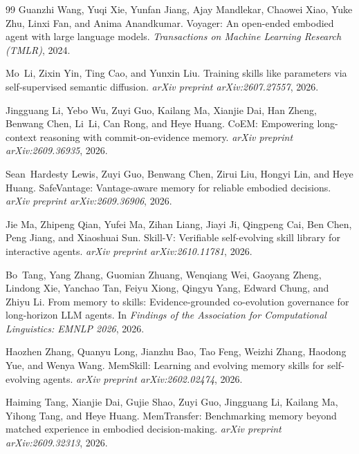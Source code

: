 \documentclass[11pt,a4paper]{article}
\begin{document}
\begin{thebibliography}{99}
Guanzhi Wang, Yuqi Xie, Yunfan Jiang, Ajay Mandlekar, Chaowei Xiao, Yuke Zhu, Linxi Fan, and Anima Anandkumar.
\newblock Voyager: An open-ended embodied agent with large language models.
\newblock \emph{Transactions on Machine Learning Research (TMLR)}, 2024.

Mo~Li, Zixin Yin, Ting Cao, and Yunxin Liu.
\newblock Training skills like parameters via self-supervised semantic diffusion.
\newblock \emph{arXiv preprint arXiv:2607.27557}, 2026.

Jingguang Li, Yebo Wu, Zuyi Guo, Kailang Ma, Xianjie Dai, Han Zheng, Benwang Chen, Li~Li, Can Rong, and Heye Huang.
\newblock CoEM: Empowering long-context reasoning with commit-on-evidence memory.
\newblock \emph{arXiv preprint arXiv:2609.36935}, 2026.

Sean~Hardesty Lewis, Zuyi Guo, Benwang Chen, Zirui Liu, Hongyi Lin, and Heye Huang.
\newblock SafeVantage: Vantage-aware memory for reliable embodied decisions.
\newblock \emph{arXiv preprint arXiv:2609.36906}, 2026.

Jie Ma, Zhipeng Qian, Yufei Ma, Zihan Liang, Jiayi Ji, Qingpeng Cai, Ben Chen, Peng Jiang, and Xiaoshuai Sun.
\newblock Skill-V: Verifiable self-evolving skill library for interactive agents.
\newblock \emph{arXiv preprint arXiv:2610.11781}, 2026.

Bo~Tang, Yang Zhang, Guomian Zhuang, Wenqiang Wei, Gaoyang Zheng, Lindong Xie, Yanchao Tan, Feiyu Xiong, Qingyu Yang, Edward Chung, and Zhiyu Li.
\newblock From memory to skills: Evidence-grounded co-evolution governance for long-horizon LLM agents.
\newblock In \emph{Findings of the Association for Computational Linguistics: EMNLP 2026}, 2026.

Haozhen Zhang, Quanyu Long, Jianzhu Bao, Tao Feng, Weizhi Zhang, Haodong Yue, and Wenya Wang.
\newblock MemSkill: Learning and evolving memory skills for self-evolving agents.
\newblock \emph{arXiv preprint arXiv:2602.02474}, 2026.

Haiming Tang, Xianjie Dai, Gujie Shao, Zuyi Guo, Jingguang Li, Kailang Ma, Yihong Tang, and Heye Huang.
\newblock MemTransfer: Benchmarking memory beyond matched experience in embodied decision-making.
\newblock \emph{arXiv preprint arXiv:2609.32313}, 2026.

\end{thebibliography}
\end{document}
